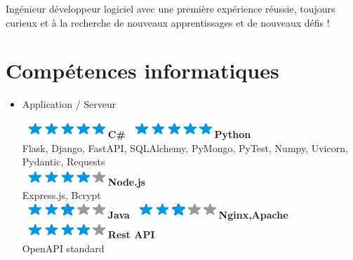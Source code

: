 \documentclass[]{friggeri-cv}
\begin{document}
\vspace*{-2.0mm}
\noindent\parbox{\linewidth}{
  \centering
  Ingénieur développeur logiciel avec une première expérience réussie, toujours curieux et à la recherche de nouveaux apprentissages et de nouveaux défis !
}
\vspace*{0.8mm}

\section{Compétences informatiques}
        \vspace*{-0.45cm}
        \setlength{\columnsep}{-0.3cm}
        \begin{flushleft}
        \begin{multicols}{3}
		\begin{itemize}
		
		\setlength{\itemsep}{5pt}
  		\setlength{\parskip}{0pt}
  		\setlength{\parsep}{0pt}
          
        
\item \large Application / Serveur \
\normalsize
\begin{flushleft}

\includegraphics[scale=0.40]{res/img/5stars.png}\hspace{1.5mm}\textbf{C\#}
\includegraphics[scale=0.40]{res/img/5stars.png}\hspace{1.5mm}\textbf{Python}\\Flask, Django, FastAPI, SQLAlchemy, PyMongo, PyTest, Numpy, Uvicorn, Pydantic, Requests\\\vspace{2mm}
\includegraphics[scale=0.40]{res/img/4stars.png}\hspace{1.5mm}\textbf{Node.js}\\Express.js, Bcrypt\\
\includegraphics[scale=0.40]{res/img/3stars.png}\hspace{1.5mm}\textbf{Java}
\includegraphics[scale=0.40]{res/img/3stars.png}\hspace{1.5mm}\textbf{\small Nginx,Apache}
\includegraphics[scale=0.40]{res/img/4stars.png}\hspace{1.5mm}\textbf{Rest API}\\OpenAPI standard\\
\end{flushleft}            


\end{itemize}
\end{multicols}
\end{flushleft}
\end{document}
